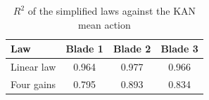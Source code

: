 \begin{table}[!t]
\centering
\caption{$R^2$ of the simplified laws against the KAN mean action}
\label{tab:lawfit}
\renewcommand{\arraystretch}{1.15}
\begin{tabular}{lccc}
\hline\hline
Law & Blade 1 & Blade 2 & Blade 3 \\
\hline
Linear law & 0.964 & 0.977 & 0.966 \\
Four gains & 0.795 & 0.893 & 0.834 \\
\hline\hline
\end{tabular}
\end{table}
